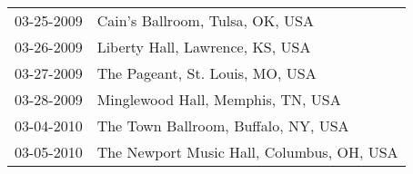 \begin{supertabular}{ll}
 03-25-2009 &            Cain's Ballroom, Tulsa, OK, USA \\
 03-26-2009 &            Liberty Hall, Lawrence, KS, USA \\
 03-27-2009 &            The Pageant, St. Louis, MO, USA \\
 03-28-2009 &          Minglewood Hall, Memphis, TN, USA \\
 03-04-2010 &        The Town Ballroom, Buffalo, NY, USA \\
 03-05-2010 &  The Newport Music Hall, Columbus, OH, USA \\
\end{supertabular}
